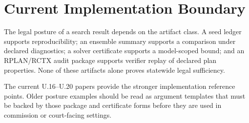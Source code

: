 \section{Current Implementation Boundary}

The legal posture of a search result depends on the artifact class.  A seed
ledger supports reproducibility; an ensemble summary supports a comparison
under declared diagnostics; a solver certificate supports a model-scoped bound;
and an RPLAN/RCTX audit package supports verifier replay of declared plan
properties.  None of these artifacts alone proves statewide legal sufficiency.

The current U.16--U.20 papers provide the stronger implementation reference
points.  Older posture examples should be read as argument templates that must
be backed by those package and certificate forms before they are used in
commission or court-facing settings.
